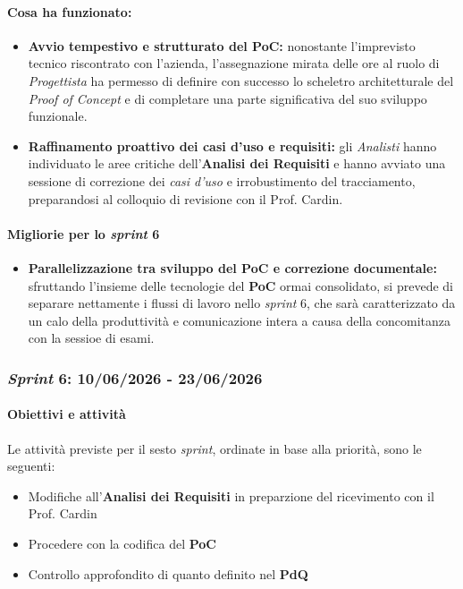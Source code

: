 \documentclass[12pt, a4paper]{article}
\begin{document}
{\paragraph{Cosa ha funzionato:}
\begin{itemize}
    \item \textbf{Avvio tempestivo e strutturato del \textbf{PoC}:} nonostante l'imprevisto tecnico riscontrato con l'azienda, l'assegnazione mirata delle ore al ruolo di \textit{Progettista} ha permesso di definire con successo lo scheletro architetturale del \textit{Proof of Concept} e di completare una parte significativa del suo sviluppo funzionale.
    \item \textbf{Raffinamento proattivo dei casi d'uso e requisiti:} gli \textit{Analisti} hanno individuato le aree critiche dell'\textbf{Analisi dei Requisiti} e hanno avviato una sessione di correzione dei \textit{casi d'uso} e irrobustimento del tracciamento, preparandosi al colloquio di revisione con il Prof. Cardin.
\end{itemize}

\paragraph{Migliorie per lo \textit{sprint} 6}
\begin{itemize}
    \item \textbf{Parallelizzazione tra sviluppo del PoC e correzione documentale:} sfruttando l'insieme delle tecnologie del \textbf{PoC} ormai consolidato, si prevede di separare nettamente i flussi di lavoro nello \textit{sprint} 6, che sarà caratterizzato da un calo della produttività e comunicazione intera a causa della concomitanza con la sessioe di esami.
\end{itemize}

\subsubsection{\textit{Sprint} 6: 10/06/2026 - 23/06/2026}

\paragraph{Obiettivi e attività}

Le attività previste per il sesto \textit{sprint}, ordinate in base alla priorità, sono le seguenti:

\begin{itemize}
    \item  Modifiche all'\textbf{Analisi dei Requisiti} in preparzione del ricevimento con il Prof. Cardin
    \item Procedere con la codifica del \textbf{PoC}
    \item Controllo approfondito di quanto definito nel \textbf{PdQ}
\end{itemize}

}
\end{document}
